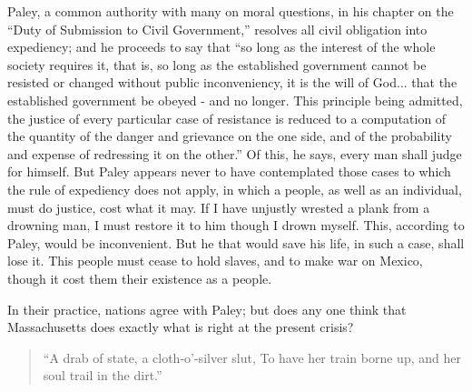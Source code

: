 \documentclass[letterpaper,12pt,english]{sphinxmanual}
\begin{document}
Paley, a common authority with many on moral questions, in his chapter on the ``Duty of Submission to Civil Government,'' resolves all civil obligation into expediency; and he proceeds to say that ``so long as the interest of the whole society requires it, that is, so long as the established government cannot be resisted or changed without public inconveniency, it is the will of God... that the established government be obeyed - and no longer. This principle being admitted, the justice of every particular case of resistance is reduced to a computation of the quantity of the danger and grievance on the one side, and of the probability and expense of redressing it on the other.'' Of this, he says, every man shall judge for himself. But Paley appears never to have contemplated those cases to which the rule of expediency does not apply, in which a people, as well as an individual, must do justice, cost what it may. If I have unjustly wrested a plank from a drowning man, I must restore it to him though I drown myself. This, according to Paley, would be inconvenient. But he that would save his life, in such a case, shall lose it. This people must cease to hold slaves, and to make war on Mexico, though it cost them their existence as a people.

In their practice, nations agree with Paley; but does any one think that Massachusetts does exactly what is right at the present crisis?
\begin{quote}

``A drab of state, a cloth-o'-silver slut,
To have her train borne up, and her soul trail in the dirt.''
\end{quote}
\end{document}
